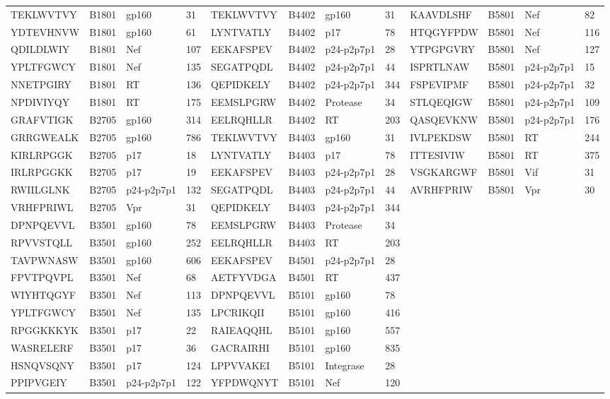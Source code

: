 \begin{table}[htp]
\begin{center}
\begin{sideways}
{\begin{tabulary}{1.5\textwidth}{|l|l|l|l|l|l|l|l|l|l|l|l|}
TEKLWVTVY & B1801 & gp160 & 31 & TEKLWVTVY & B4402 & gp160 & 31 & KAAVDLSHF & B5801 & Nef & 82 \\
YDTEVHNVW & B1801 & gp160 & 61 & LYNTVATLY & B4402 & p17 & 78 & HTQGYFPDW & B5801 & Nef & 116 \\
QDILDLWIY & B1801 & Nef & 107 & EEKAFSPEV & B4402 & p24-p2p7p1 & 28 & YTPGPGVRY & B5801 & Nef & 127 \\
YPLTFGWCY & B1801 & Nef & 135 & SEGATPQDL & B4402 & p24-p2p7p1 & 44 & ISPRTLNAW & B5801 & p24-p2p7p1 & 15 \\
NNETPGIRY & B1801 & RT & 136 & QEPIDKELY & B4402 & p24-p2p7p1 & 344 & FSPEVIPMF & B5801 & p24-p2p7p1 & 32 \\
NPDIVIYQY & B1801 & RT & 175 & EEMSLPGRW & B4402 & Protease & 34 & STLQEQIGW & B5801 & p24-p2p7p1 & 109 \\
GRAFVTIGK & B2705 & gp160 & 314 & EELRQHLLR & B4402 & RT & 203 & QASQEVKNW & B5801 & p24-p2p7p1 & 176 \\
GRRGWEALK & B2705 & gp160 & 786 & TEKLWVTVY & B4403 & gp160 & 31 & IVLPEKDSW & B5801 & RT & 244 \\
KIRLRPGGK & B2705 & p17 & 18 & LYNTVATLY & B4403 & p17 & 78 & ITTESIVIW & B5801 & RT & 375 \\
IRLRPGGKK & B2705 & p17 & 19 & EEKAFSPEV & B4403 & p24-p2p7p1 & 28 & VSGKARGWF & B5801 & Vif & 31 \\
RWIILGLNK & B2705 & p24-p2p7p1 & 132 & SEGATPQDL & B4403 & p24-p2p7p1 & 44 & AVRHFPRIW & B5801 & Vpr & 30 \\
VRHFPRIWL & B2705 & Vpr & 31 & QEPIDKELY & B4403 & p24-p2p7p1 & 344 &  &  &  &  \\
DPNPQEVVL & B3501 & gp160 & 78 & EEMSLPGRW & B4403 & Protease & 34 &  &  &  &  \\
RPVVSTQLL & B3501 & gp160 & 252 & EELRQHLLR & B4403 & RT & 203 &  &  &  &  \\
TAVPWNASW & B3501 & gp160 & 606 & EEKAFSPEV & B4501 & p24-p2p7p1 & 28 &  &  &  &  \\
FPVTPQVPL & B3501 & Nef & 68 & AETFYVDGA & B4501 & RT & 437 &  &  &  &  \\
WIYHTQGYF & B3501 & Nef & 113 & DPNPQEVVL & B5101 & gp160 & 78 &  &  &  &  \\
YPLTFGWCY & B3501 & Nef & 135 & LPCRIKQII & B5101 & gp160 & 416 &  &  &  &  \\
RPGGKKKYK & B3501 & p17 & 22 & RAIEAQQHL & B5101 & gp160 & 557 &  &  &  &  \\
WASRELERF & B3501 & p17 & 36 & GACRAIRHI & B5101 & gp160 & 835 &  &  &  &  \\
HSNQVSQNY & B3501 & p17 & 124 & LPPVVAKEI & B5101 & Integrase & 28 &  &  &  &  \\
PPIPVGEIY & B3501 & p24-p2p7p1 & 122 & YFPDWQNYT & B5101 & Nef & 120 &  &  &  & \bigstrut[b] \\
\hline
\end{tabulary}
}
\end{sideways}
\end{center}
\end{table}

